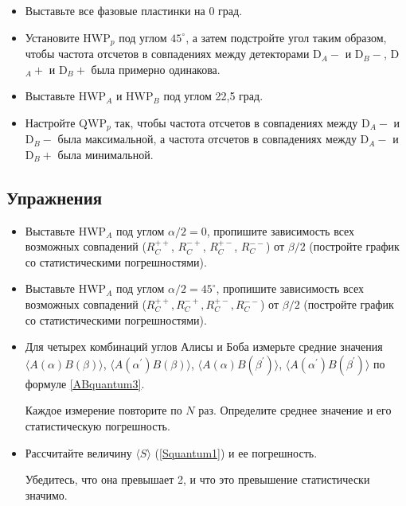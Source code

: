 \documentclass[12pt,a5paper]{article}
\numberwithin{equation}{section}
\begin{document}
\begin{itemize}
\item{Выставьте все фазовые пластинки на 0 град.}
\item{Установите HWP$_p$ под углом $45^\circ$, а затем подстройте угол таким образом, чтобы частота отсчетов в совпадениях между детекторами D$_A-$ и D$_B-$,  D$_A+$ и D$_B+$ была примерно одинакова.}
\item{Выставьте HWP$_A$ и HWP$_B$ под углом 22,5 град.}
\item{Настройте QWP$_p$ так, чтобы частота отсчетов в совпадениях между D$_A-$ и D$_B-$ была максимальной, а   частота отсчетов в совпадениях между D$_A-$ и D$_B+$ была минимальной.}
\end{itemize}

\subsection{Упражнения}
\begin{itemize}
\item{Выставьте HWP$_A$ под углом $\alpha/2=0$, пропишите зависимость всех возможных совпадений ($R_C^{++}$, $R_C^{-+}$, $R_C^{+-}$, $R_C^{--}$) от $\beta/2$  (постройте график со статистическими погрешностями).}
\item{Выставьте HWP$_A$ под углом $\alpha/2=45^\circ$, пропишите зависимость всех возможных совпадений ($R_C^{++}, R_C^{-+}, R_C^{+-}, R_C^{--}$) от $\beta/2$  (постройте график со статистическими погрешностями).}
\item{Для четырех комбинаций углов Алисы и Боба измерьте средние значения $\langle A(\alpha)B(\beta) \rangle$, $\langle A(\alpha^\prime)B(\beta) \rangle$, $\langle A(\alpha)B(\beta^\prime) \rangle$, $\langle A(\alpha^\prime)B(\beta^\prime) \rangle$ по формуле \eqref{ABquantum3}.

    Каждое измерение повторите по $N$ раз. Определите среднее значение и его статистическую погрешность.}
\item{Рассчитайте величину $\langle S \rangle$ (\ref{Squantum1}) и ее погрешность}.

    Убедитесь, что она превышает 2, и что это превышение статистически значимо.
\end{itemize}

\end{document}
